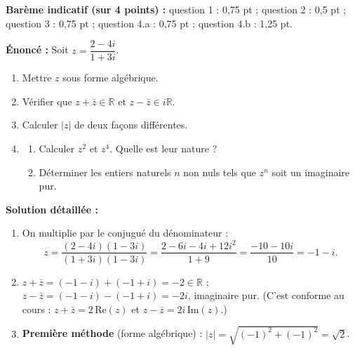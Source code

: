 \documentclass[11pt]{article}
\begin{document}
\begin{corrige}
\textbf{Barème indicatif (sur 4 points) :} question 1 : 0,75 pt ; question 2 : 0,5 pt ; question 3 : 0,75 pt ; question 4.a : 0,75 pt ; question 4.b : 1,25 pt.

\textbf{Énoncé :} Soit $z = \dfrac{2-4i}{1+3i}$.
\begin{enumerate}
\item Mettre $z$ sous forme algébrique.
\item Vérifier que $z + \bar{z} \in \mathbb{R}$ et $z - \bar{z} \in i\mathbb{R}$.
\item Calculer $|z|$ de deux façons différentes.
\item \begin{enumerate}
\item Calculer $z^2$ et $z^4$. Quelle est leur nature ?
\item Déterminer les entiers naturels $n$ non nuls tels que $z^n$ soit un imaginaire pur.
\end{enumerate}
\end{enumerate}
\tcblower
\textbf{Solution détaillée :}
\begin{enumerate}
\item On multiplie par le conjugué du dénominateur :
\[ z = \dfrac{(2-4i)(1-3i)}{(1+3i)(1-3i)} = \dfrac{2 - 6i - 4i + 12i^2}{1+9} = \dfrac{-10 - 10i}{10} = -1 - i. \]
\item $z + \bar{z} = (-1-i) + (-1+i) = -2 \in \mathbb{R}$ ; $z - \bar{z} = (-1-i) - (-1+i) = -2i$, imaginaire pur. (C'est conforme au cours : $z+\bar{z} = 2\,\mathrm{Re}(z)$ et $z - \bar{z} = 2i\,\mathrm{Im}(z)$.)
\item \textbf{Première méthode} (forme algébrique) : $|z| = \sqrt{(-1)^2 + (-1)^2} = \sqrt{2}$.


\end{enumerate}
\end{corrige}
\end{document}
